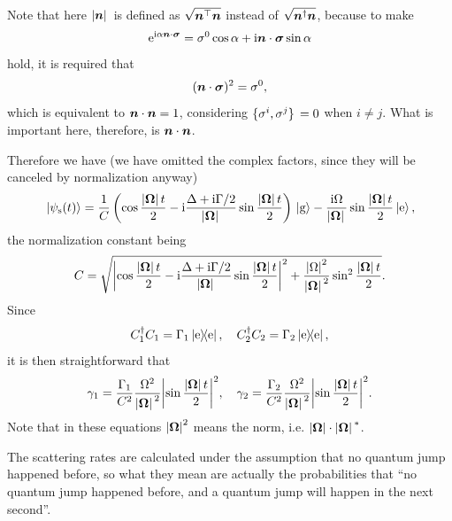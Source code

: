 \documentclass[hyperref, a4paper]{article}
\newcommand*{\ii}{\mathrm{i}}
\newcommand*{\ee}{\mathrm{e}}
\begin{document}
\begin{itemize}
\begin{equation}
    \label{eq:omega-abs-2}
\end{equation}
\begin{note*}{}{}
    Note that here $\abs*{\vb*{n}}$ is defined as $\sqrt{\vb*{n}^\top \vb*{n}}$ instead of 
    $\sqrt{\vb*{n}^\dagger \vb*{n}}$, because to make 
    \[
        \ee^{\ii \alpha \vb*{n} \cdot \vb*{\sigma}} = \sigma^0 \cos \alpha + \ii \vb*{n} \cdot \vb*{\sigma} \sin \alpha
    \]
    hold, it is required that 
    \[
        (\vb*{n} \cdot \vb*{\sigma})^2 = \sigma^0,
    \]
    which is equivalent to $\vb*{n} \cdot \vb*{n} = 1$, considering $\acomm*{\sigma^i}{\sigma^j} = 0$ 
    when $i \neq j$. What is important here, therefore, is $\vb*{n} \cdot \vb*{n}$.
\end{note*}
Therefore we have (we have omitted the complex factors, since they will be canceled by normalization anyway) 
\begin{equation}
    \ket*{\psi_\text{s}(t)} = \frac{1}{C} \left( \cos \frac{\abs*{\vb*{\Omega}} t}{2} - \ii \frac{\Delta + \ii \Gamma / 2}{\abs*{\vb*{\Omega}}} \sin \frac{\abs*{\vb*{\Omega}} t}{2}  \right) \ket*{\text{g}} - \frac{\ii \Omega}{\abs*{\vb*{\Omega}}} \sin \frac{\abs*{\vb*{\Omega}} t}{2} \ket*{\text{e}},
\end{equation}
the normalization constant being 
\begin{equation}
    C = \sqrt{ \abs{\cos \frac{\abs*{\vb*{\Omega}} t}{2} - \ii \frac{\Delta + \ii \Gamma / 2}{\abs*{\vb*{\Omega}}} \sin \frac{\abs*{\vb*{\Omega}} t}{2} }^2 + \frac{\abs{\Omega}^2}{\abs*{\vb*{\Omega}}^2} \sin^2 \frac{\abs*{\vb*{\Omega}} t}{2} }.
\end{equation}
Since  
\[
    C_1^\dagger C_1 = \Gamma_1 \dyad{\text{e}}, \quad C_2^\dagger C_2 = \Gamma_2 \dyad{\text{e}},
\]
it is then straightforward that 
\begin{equation}
    \gamma_1 = \frac{\Gamma_1}{{C}^2} \frac{\Omega^2}{\abs*{\vb*{\Omega}}^2} \abs{\sin \frac{\abs*{\vb*{\Omega}} t}{2}}^2,
    \quad \gamma_2 = \frac{\Gamma_2}{{C}^2} \frac{\Omega^2}{\abs*{\vb*{\Omega}}^2} \abs{\sin \frac{\abs*{\vb*{\Omega}} t}{2}}^2.
\end{equation}
Note that in these equations $\abs{\vb*{\Omega}}^2$ means the norm, i.e. $\abs{\vb*{\Omega}} \cdot \abs*{\vb*{\Omega}}^*$. 

The scattering rates are calculated under the assumption that no quantum jump happened before, so what they mean
are actually the probabilities that ``no quantum jump happened before, and a quantum jump will happen in the next 
second''.


\end{itemize}
\end{document}
